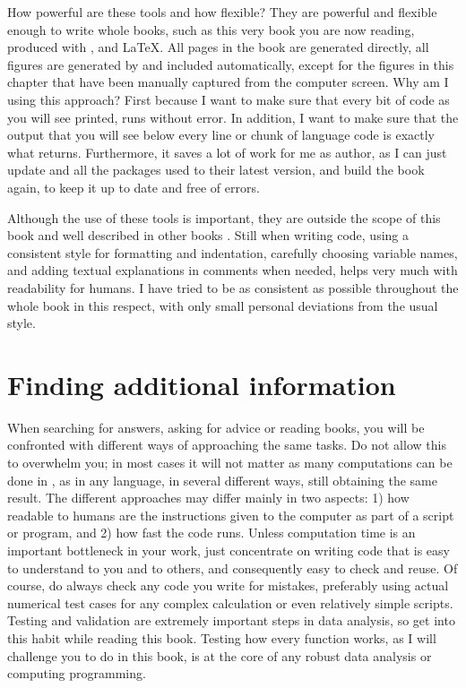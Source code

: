 \documentclass[krantz2]{krantz}\usepackage{knitr}
\begin{document}
How powerful are these tools and how flexible? They are powerful and flexible enough to write whole books, such as this very book you are now reading, produced with \Rpgrm,  and \LaTeX{}. All pages in the book are generated directly, all figures are generated by \Rpgrm and included automatically, except for the figures in this chapter that have been manually captured from the computer screen. Why am I using this approach? First because I want to make sure that every bit of code as you will see printed, runs without error. In addition, I want to make sure that the output that you will see below every line or chunk of \Rlang language code is exactly what \Rpgrm returns. Furthermore, it saves a lot of work for me as author, as I can just update \Rpgrm and all the packages used to their latest version, and build the book again, to keep it up to date and free of errors.

Although the use of these tools is important, they are outside the scope of this book and well described in other books \autocite{Gandrud2015,Xie2013}. Still when writing code, using a consistent style for formatting and indentation, carefully choosing variable names, and adding textual explanations in comments when needed, helps very much with readability for humans. I have tried to be as consistent as possible throughout the whole book in this respect, with only small personal deviations from the usual style.

\section{Finding additional information}

When searching for answers, asking for advice or reading books, you will be confronted with different ways of approaching the same tasks. Do not allow this to overwhelm you; in most cases it will not matter as many computations can be done in \Rpgrm, as in any language, in several different ways, still obtaining the same result. The different approaches may differ mainly in two aspects: 1) how readable to humans are the instructions given to the computer as part of a script or program, and 2) how fast the code runs. Unless computation time is an important bottleneck in your work, just concentrate on writing code that is easy to understand to you and to others, and consequently easy to check and reuse. Of course, do always check any code you write for mistakes, preferably using actual numerical test cases for any complex calculation or even relatively simple scripts. Testing and validation are extremely important steps in data analysis, so get into this habit while reading this book. Testing how every function works, as I will challenge you to do in this book, is at the core of any robust data analysis or computing programming.
\end{document}
